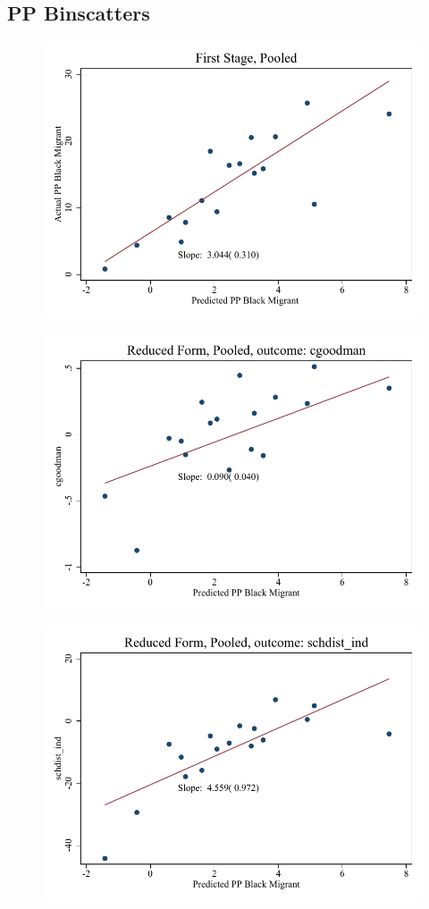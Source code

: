 \documentclass{article}
\begin{document}
\subsection{PP Binscatters}
\clearpage
\begin{figure}
	\centering
	\includegraphics[width=.8\textwidth]{figures/binscatter/pooled_fs.pdf}
\end{figure}
\clearpage
\begin{figure}
	\centering
	\includegraphics[width=.8\textwidth]{figures/binscatter/pooled_cgoodman_rf.pdf}
\end{figure}
\clearpage
\begin{figure}
	\centering
	\includegraphics[width=.8\textwidth]{figures/binscatter/pooled_schdist_ind_rf.pdf}
\end{figure}
\end{document}
